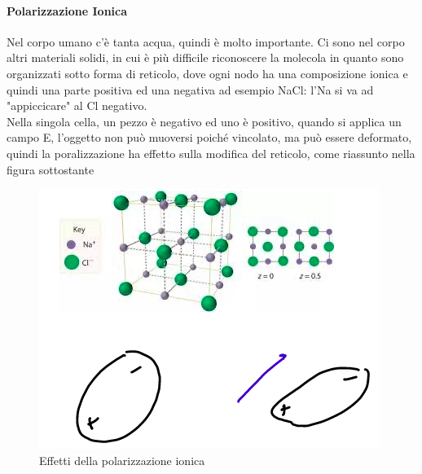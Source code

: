 \documentclass[oneside, 12pt]{extbook}
\begin{document}
\paragraph{Polarizzazione Ionica}
Nel corpo umano c'è tanta acqua, quindi è molto importante. Ci sono nel corpo altri materiali solidi, in cui è più difficile riconoscere la molecola in quanto sono organizzati sotto forma di reticolo, dove ogni nodo ha una composizione ionica e quindi una parte positiva ed una negativa ad esempio NaCl: l'Na si va ad "appiccicare" al Cl negativo.\\Nella singola cella, un pezzo è negativo ed uno è positivo, quando si applica un campo E, l'oggetto non può muoversi poiché vincolato, ma può essere deformato, quindi la poralizzazione ha effetto sulla modifica del reticolo, come riassunto nella figura sottostante
\begin{figure}[!h]
	\includegraphics[scale = 0.5]{immagini/pol_io_effetti.png}
	\caption{Effetti della polarizzazione ionica}
\end{figure}
\end{document}
